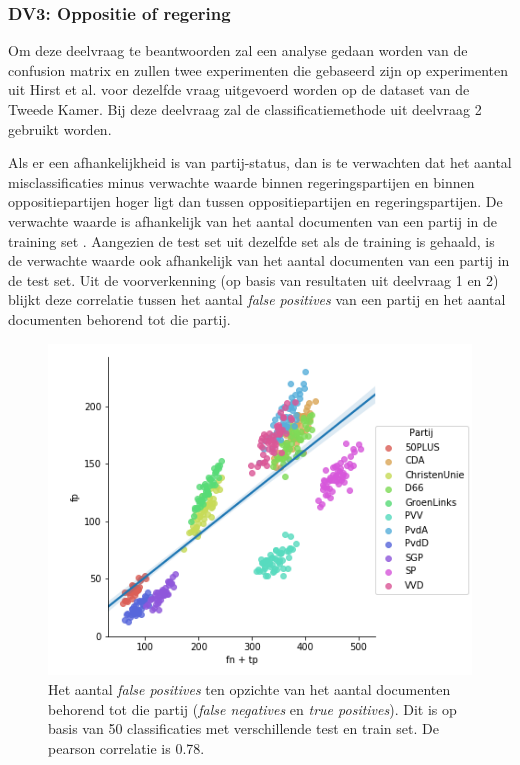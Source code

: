 \subsubsection{DV3: Oppositie of regering}

Om deze deelvraag te beantwoorden zal een analyse gedaan worden van de confusion matrix en zullen twee experimenten die gebaseerd zijn op experimenten uit Hirst et al. voor dezelfde vraag uitgevoerd worden op de dataset van de Tweede Kamer. Bij deze deelvraag zal de classificatiemethode uit deelvraag 2 gebruikt worden.\par
Als er een afhankelijkheid is van partij-status, dan is te verwachten dat het aantal misclassificaties minus verwachte waarde binnen regeringspartijen en binnen oppositiepartijen hoger ligt dan tussen oppositiepartijen en regeringspartijen. De verwachte waarde is afhankelijk van het aantal documenten van een partij in de training set \cite{Sahare}. Aangezien de test set uit dezelfde set als de training is gehaald, is de verwachte waarde ook afhankelijk van het aantal documenten van een partij in de test set. Uit de voorverkenning (op basis van resultaten uit deelvraag 1 en 2) blijkt deze correlatie tussen het aantal \textit{false positives} van een partij en het aantal documenten behorend tot die partij.
\begin{figure}[H]
  \centering
    \includegraphics[width=0.60\paperwidth]{Verslag/Handmatig/Correlation.png}
\caption{Het aantal \textit{false positives} ten opzichte van het aantal documenten behorend tot die partij (\textit{false negatives} en \textit{true positives}). Dit is op basis van 50 classificaties met verschillende test en train set. De pearson correlatie is 0.78.}
\label{fig:correlation}
\end{figure}
